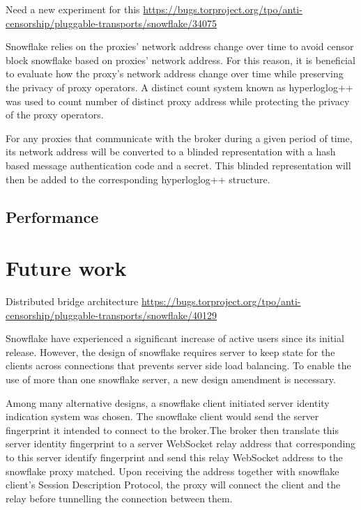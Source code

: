 \documentclass[letterpaper,twocolumn]{article}
\begin{document}
Need a new experiment for this
\url{https://bugs.torproject.org/tpo/anti-censorship/pluggable-transports/snowflake/34075}


Snowflake relies on the proxies' network address change over time to avoid censor block snowflake based on proxies' network address. For this reason, it is beneficial to evaluate how the proxy's network address change over time while preserving the privacy of proxy operators. A distinct count system known as hyperloglog++ was used to count number of distinct proxy address while protecting the privacy of the proxy operators.

For any proxies that communicate with the broker during a given period of time, its network address will be converted to a blinded representation with a hash based message authentication code and a secret. This blinded representation will then be added to the corresponding hyperloglog++ structure.

\subsection{Performance}
\label{sec:performance}


\section{Future work}
\label{sec:future}


Distributed bridge architecture
\url{https://bugs.torproject.org/tpo/anti-censorship/pluggable-transports/snowflake/40129}

Snowflake have experienced a significant increase of active users since its initial release. However, the design of snowflake requires server to keep state for the clients across connections that prevents server side load balancing. To enable the use of more than one snowflake server, a new design amendment is necessary.

Among many alternative designs, a snowflake client initiated server identity indication system was chosen. The snowflake client would send the server fingerprint it intended to connect to the broker.The broker then translate this server identity fingerprint to a server WebSocket relay address that corresponding to this server identify fingerprint and send this relay WebSocket address to the snowflake proxy matched. Upon receiving the address together with snowflake client's Session Description Protocol, the proxy will connect the client and the relay before tunnelling the connection between them.
\end{document}

